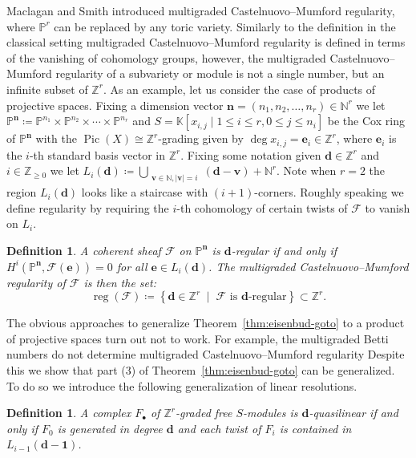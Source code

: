 \documentclass[11pt,reqno]{amsart}
\newtheorem{defn}[lemma]{Definition}
\theoremstyle{remark}
\newcommand{\reg}{\operatorname{reg}}
\newcommand{\Pic}{\operatorname{Pic}}
\newcommand{\dd}{\mathbf{d}}
\newcommand{\nn}{\mathbf{n}}
\newcommand{\ee}{\mathbf{e}}
\newcommand{\vv}{\mathbf{v}}
\newcommand{\one}{\mathbf{1}}
\newcommand{\KK}{\mathbb{K}}
\newcommand{\NN}{\mathbb{N}}
\newcommand{\PP}{\mathbb{P}}
\newcommand{\ZZ}{\mathbb{Z}}
\newcommand{\cF}{\mathcal{F}}
\begin{document}
Maclagan and Smith introduced multigraded Castelnuovo--Mumford regularity, where $\PP^{r}$ can be replaced by any toric variety. Similarly to the definition in the classical setting multigraded Castelnuovo--Mumford regularity is defined in terms of the vanishing of cohomology groups, however, the multigraded Castelnuovo--Mumford regularity of a subvariety or module is not a single number, but an infinite subset of $\ZZ^{r}$. As an example, let us consider the case of products of projective spaces. Fixing a dimension vector $\nn=(n_1,n_2,\ldots,n_{r})\in \NN^{r}$ we let $\PP^{\nn}\coloneqq \PP^{n_1}\times \PP^{n_2}\times \cdots \times \PP^{n_r}$ and $S=\KK[x_{i,j} \; |\; 1\leq i \leq r, 0\leq j \leq n_{i}]$ be the Cox ring of $\PP^{\nn}$ with the $\Pic(X)\cong \ZZ^{r}$-grading given by $\deg x_{i,j} = \ee_{i} \in \ZZ^{r}$, where $\ee_{i}$ is the $i$-th standard basis vector in $\ZZ^{r}$. Fixing some notation given $\dd\in \ZZ^{r}$ and $i\in \ZZ_{\geq0}$ we let $L_{i}(\dd)\coloneqq \bigcup_{\substack{\vv \in \NN, |\vv| = i}} (\dd-\vv)+\NN^{r}$. Note when $r=2$ the region $L_{i}(\dd)$ looks like a staircase with $(i+1)$-corners. Roughly speaking we define regularity by requiring the $i$-th cohomology of certain twists of $\cF$ to vanish on $L_{i}$. 

\begin{defn}\cite[Definition 6.1]{maclaganSmith04}\label{def:mg-reg}
A coherent sheaf $\cF$ on $\PP^{\nn}$ is $\dd$-regular if and only if $H^i\left(\PP^{\nn}, \cF(\ee)\right) =0$ for all $\ee\in L_{i}(\dd)$. The multigraded Castelnuovo--Mumford regularity of $\cF$ is then the set: 
\[
\reg(\cF) \coloneqq \left \{ \dd\in \ZZ^{r} \;\; \big| \;\; \text{$\cF$ is $\dd$-regular}\right\}\subset \ZZ^{r}.
\]
\end{defn}


The obvious approaches to generalize Theorem~\ref{thm:eisenbud-goto} to a product of projective spaces turn out not to work. For example, the multigraded Betti numbers do not determine multigraded Castelnuovo--Mumford regularity \cite[Example 5.1]{bruceHellerSayrafi21} Despite this we show that part (3) of Theorem~\ref{thm:eisenbud-goto} can be generalized. To do so we introduce the following generalization of linear resolutions. 

\begin{defn}
A complex $F_{\bullet}$ of $\ZZ^{r}$-graded free $S$-modules is $\dd$-quasilinear if and only if $F_{0}$ is generated in degree $\dd$ and each twist of $F_{i}$ is contained in $L_{i-1}(\dd-\one)$.
\end{defn}
\end{document}
